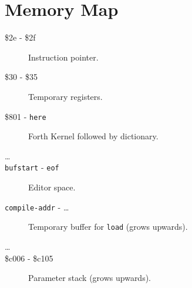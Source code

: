 \chapter{Memory Map}

\begin{description}
\item[\$2e - \$2f] Instruction pointer.
\item[\$30 - \$35] Temporary registers.
\item[\$801 - \texttt{here}] Forth Kernel followed by dictionary.
\item[\ldots]
\item[\texttt{bufstart} - \texttt{eof}] Editor space.
\item[\texttt{compile-addr} - \ldots] Temporary buffer for \texttt{load} (grows upwards).
\item[\ldots]
\item[\$c006 - \$c105] Parameter stack (grows upwards).
\end{description}

